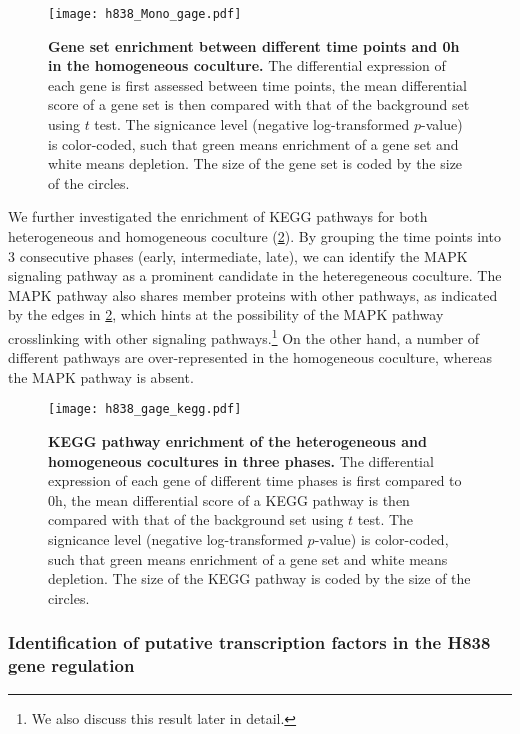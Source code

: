 \begin{figure}[!ht]
\begin{center}
\texttt{[image: h838\_Mono\_gage.pdf]}
\end{center}
\caption[Gene set enrichment of the homogeneous coculture]{
{\bf Gene set enrichment between different time points and 0h in the homogeneous 
coculture.} 
The differential expression of each gene is first assessed between time points, 
the mean differential score of a gene set
is then compared with that of the background set using $t$ test.
The signicance level (negative log-transformed $p$-value) is color-coded, such
that green means enrichment of a gene set and white means depletion. The size
of the gene set is coded by the size of the circles.
}
\label{fig:h838_homo_gage}
\end{figure}

We further investigated
the enrichment of KEGG pathways for both heterogeneous and homogeneous 
coculture (\ref{fig:h838_gage_kegg}). By grouping the time points into 3 
consecutive phases (early,
intermediate, late), we can identify the MAPK signaling pathway as a prominent 
candidate in the heteregeneous coculture. The MAPK pathway also shares 
member proteins with other pathways, as indicated by the edges in 
\ref{fig:h838_gage_kegg}, which hints at the possibility of the MAPK pathway
crosslinking with other signaling pathways.\footnote{We also discuss this
result later in detail.} On the other hand, a number of different pathways 
are over-represented in the homogeneous coculture, whereas the MAPK
pathway is absent.

\begin{figure}[!ht]
\begin{center}
\texttt{[image: h838\_gage\_kegg.pdf]}
\end{center}
\caption[KEGG pathway enrichment]{
{\bf KEGG pathway enrichment of the heterogeneous and homogeneous 
cocultures in three phases.} 
The differential expression of each gene of different time phases is first 
compared to 0h, the mean differential score of a KEGG pathway
is then compared with that of the background set using $t$ test.
The signicance level (negative log-transformed $p$-value) is color-coded, such
that green means enrichment of a gene set and white means depletion. The size
of the KEGG pathway is coded by the size of the circles.
}
\label{fig:h838_gage_kegg}
\end{figure}

\subsubsection{Identification of putative transcription factors in the H838 gene regulation}

